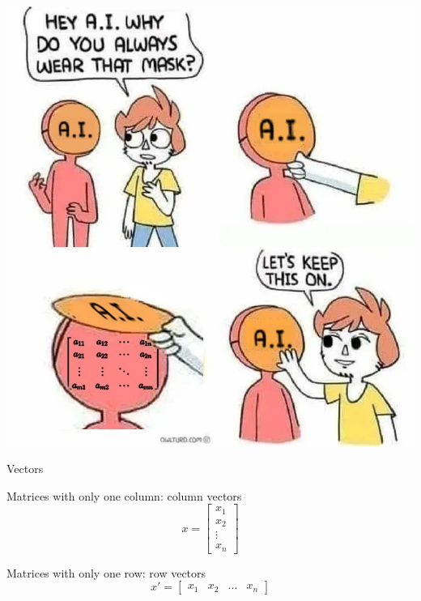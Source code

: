 \documentclass{./../../Latex/teaching_slides}
\begin{document}
\begin{frame}{}
\centering
\includegraphics[scale=0.3]{AI_linal.jpeg}
\end{frame}

\begin{frame}{Vectors}
\begin{witemize}
\item Matrices with only one column: column vectors 
$$ x =  \begin{bmatrix}
x_1\\
x_2 \\
\vdots \\
x_n
\end{bmatrix} $$
\item Matrices with only one row: row vectors
$$ x' =  \begin{bmatrix}
x_1 &
x_2 & \hdots &
x_n
\end{bmatrix} $$
\end{witemize}
\end{frame}
\end{document}
